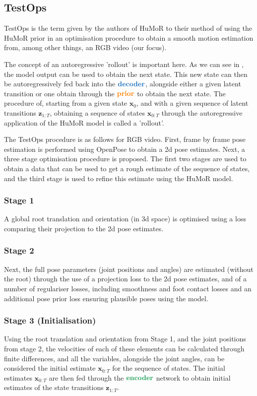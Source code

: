 \subsection{TestOps}

TestOps is the term given by the authors of HuMoR to their method of using the HuMoR prior in an optimisation procedure to obtain a smooth motion estimation from, among other things, an RGB video (our focus).

The concept of an autoregressive 'rollout' is important here. As we can see in , the model output can be used to obtain the next state. This new state can then be autoregressively fed back into the $\textbf{\textcolor{RoyalBlue}{decoder}}$, alongside either a given latent transition or one obtain through the $\textbf{\textcolor{orange}{prior}}$ to obtain the next state. The procedure of, starting from a given state $\mathbf{x}_0$, and with a given sequence of latent transitions $\textbf{z}_{1:T}$, obtaining a sequence of states $\mathbf{x}_{0:T}$ through the autoregressive application of the HuMoR model is called a 'rollout'.

The TestOps procedure is as follows for RGB video. First, frame by frame pose estimation is performed using OpenPose \cite{openPose} to obtain a 2d pose estimates. Next, a three stage optimisation procedure is proposed. The first two stages are used to obtain a data that can be used to get a rough estimate of the sequence of states, and the third stage is used to refine this estimate using the HuMoR model.

\subsubsection{Stage 1}
A global root translation and orientation (in 3d space) is optimised using a loss comparing their projection to the 2d pose estimates.

\subsubsection{Stage 2}
\label{sec:humor_stage_2}
Next, the full pose parameters (joint positions and angles) are estimated (without the root) through the use of a projection loss to the 2d pose estimates, and of a number of regulariser losses, including smoothness and foot contact losses and an additional pose prior loss ensuring plausible poses using the \cite{VPoser} model. 

\subsubsection{Stage 3 (Initialisation)}
Using the root translation and orientation from Stage 1, and the joint positions from stage 2, the velocities of each of these elements can be calculated through finite differences, and all the variables, alongside the joint angles, can be considered the initial estimate $\mathbf{x}_{0:T}$ for the sequence of states. The initial estimates $\mathbf{x}_{0:T}$ are then fed through the $\textbf{\textcolor{ForestGreen}{encoder}}$ network to obtain initial estimates of the state transitions $\textbf{z}_{1:T}$.

